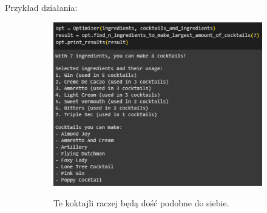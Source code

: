 \documentclass{article}
\begin{document}
Przykład działania:
\begin{figure}[ht]
    \centering
    \begin{subfigure}{0.45\textwidth}
        \centering
        \includegraphics[width=\textwidth]{opt_1.png}
        \label{fig:image1}
        \caption{Te koktajli raczej będą dość podobne do siebie.}
    \end{subfigure}
    \hfill
    \begin{subfigure}{0.38\textwidth}
        \centering

\end{subfigure}
\end{figure}
\end{document}
